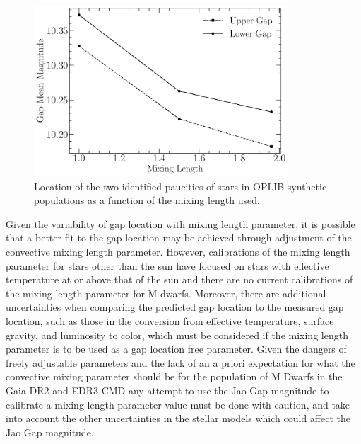 \begin{figure}
	\centering
	\includegraphics[width=0.85\textwidth]{figures/jaoOpacity/./MixingLengthScaling.pdf}
	\caption{Location of the two identified paucities of stars in OPLIB synthetic
	populations as a function of the mixing length used.}
	\label{fig:MixingLengthScaling}
\end{figure}

Given the variability of gap location with mixing length parameter, it is
possible that a better fit to the gap location may be achieved through
adjustment of the convective mixing length parameter. However, calibrations of
the mixing length parameter for stars other than the sun have focused on stars
with effective temperature at or above that of the sun and there are no current
calibrations of the mixing length parameter for M dwarfs. Moreover, there are
additional uncertainties when comparing the predicted gap location to the
measured gap location, such as those in the conversion from effective
temperature, surface gravity, and luminosity to color, which must be considered
if the mixing length parameter is to be used as a gap location free parameter. Given the
dangers of freely adjustable parameters and the lack of an a priori expectation
for what the convective mixing parameter should be for the population of M
Dwarfs in the Gaia DR2 and EDR3 CMD any attempt to use the Jao Gap magnitude to
calibrate a mixing length parameter value must be done with caution, and take into
account the other uncertainties in the stellar models which could affect the
Jao Gap magnitude.

